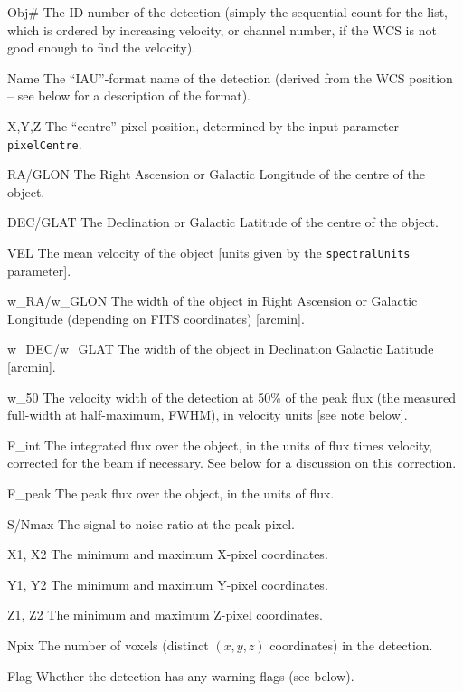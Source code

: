 \begin{Lentry}
\item[{Obj\#}] The ID number of the detection (simply the
  sequential count for the list, which is ordered by increasing
  velocity, or channel number, if the WCS is not good enough to find
  the velocity).
\item[{Name}] The ``IAU''-format name of the detection (derived from the
  WCS position -- see below for a description of the format).
\item[{X,Y,Z}] The ``centre'' pixel position, determined by the input
  parameter \texttt{pixelCentre}.
\item[{RA/GLON}] The Right Ascension or Galactic Longitude of the centre
  of the object.
\item[{DEC/GLAT}] The Declination or Galactic Latitude of the centre of
  the object.
\item[{VEL}] The mean velocity of the object [units given by the
  \texttt{spectralUnits} parameter].
\item[{w\_RA/w\_GLON}] The width of the object in Right Ascension or
  Galactic Longitude (depending on FITS coordinates) [arcmin].
\item[{w\_DEC/w\_GLAT}] The width of the object in Declination Galactic
  Latitude [arcmin].
\item[{w\_50}] The velocity width of the detection at 50\% of the peak
  flux (the measured full-width at half-maximum, FWHM), in velocity
  units [see note below].
\item[{F\_int}] The integrated flux over the object, in the units of
  flux times velocity, corrected for the beam if necessary. See below
  for a discussion on this correction.
\item[{F\_peak}] The peak flux over the object, in the units of flux.
\item[{S/Nmax}] The signal-to-noise ratio at the peak pixel.
\item[{X1, X2}] The minimum and maximum X-pixel coordinates.
\item[{Y1, Y2}] The minimum and maximum Y-pixel coordinates.
\item[{Z1, Z2}] The minimum and maximum Z-pixel coordinates.
\item[{Npix}] The number of voxels (\ie distinct $(x,y,z)$ coordinates)
  in the detection.
\item[{Flag}] Whether the detection has any warning flags (see below).
\end{Lentry}

